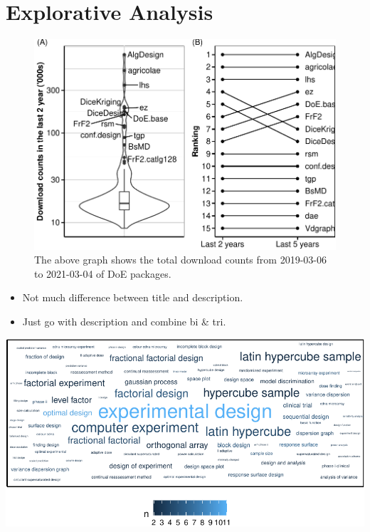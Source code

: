\hypertarget{explorative-analysis}{%
\section{Explorative Analysis}\label{explorative-analysis}}

\begin{Schunk}
\begin{figure}[htbp]

{\centering \includegraphics{paper_files/figure-latex/dlplots-1} 

}

\caption[The above graph shows the total download counts from 2019-03-06 to 2021-03-04 of DoE packages]{The above graph shows the total download counts from 2019-03-06 to 2021-03-04 of DoE packages.}\label{fig:dlplots}
\end{figure}
\end{Schunk}

\begin{itemize}
\tightlist
\item
  Not much difference between title and description.
\item
  Just go with description and combine bi \& tri.
\end{itemize}

\begin{Schunk}


\begin{center}\includegraphics{paper_files/figure-latex/wordcloud-1} \end{center}

\end{Schunk}

